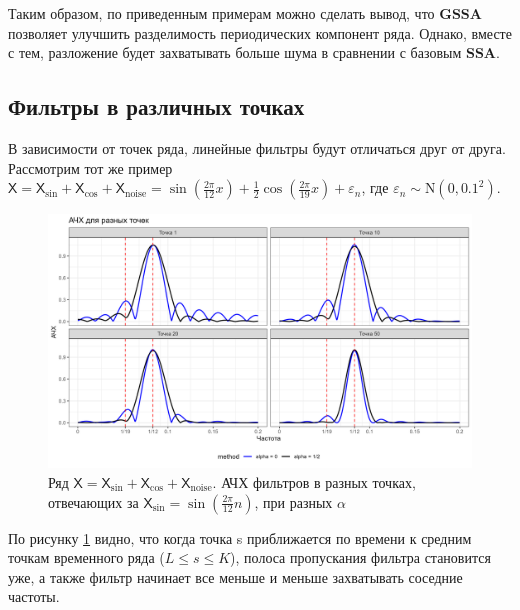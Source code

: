 \documentclass[a4paper, 11pt]{article}
\newcommand{\SSA}{\textbf{SSA}}
\newcommand{\GSSA}{\textbf{GSSA}}
\newcommand{\TS}{\mathsf{X}}
\begin{document}
Таким образом, по приведенным примерам можно сделать вывод, что $\GSSA$ позволяет улучшить разделимость периодических компонент ряда. Однако, вместе с тем, разложение будет захватывать больше шума в сравнении с базовым $\SSA$.


\subsection{Фильтры в различных точках}
В зависимости от точек ряда, линейные фильтры будут отличаться друг от друга. Рассмотрим тот же пример $\TS = \TS_{\sin} + \TS_{\cos} + \TS_{\mathrm{noise}} =
	\sin\left(\frac{2\pi}{12}x\right) +
	\frac{1}{2}\cos\left(\frac{2\pi}{19}x\right)+
	\varepsilon_n$,
где $\varepsilon_n \sim \mathrm N(0, 0.1^2)$.
\begin{figure}[H]
	\centering
	\includegraphics[width=1\textwidth]{img/afc_4_points.png}
	\caption{Ряд $\TS = \TS_{\sin} + \TS_{\cos}+ \TS_{\mathrm{noise}}$. АЧХ фильтров в разных точках, отвечающих за $\TS_{\sin} = \sin\left(\frac{2\pi}{12} n \right)$, при разных $\alpha$}
	\label{fig:filter_point_depends}
\end{figure}

По рисунку \ref{fig:filter_point_depends} видно, что когда точка s приближается по времени к средним точкам временного ряда ($L \leq s \leq K$), полоса пропускания фильтра становится уже, а также фильтр начинает все меньше и меньше захватывать соседние частоты.
\end{document}
